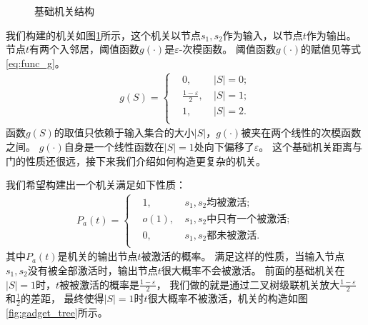 \begin{figure}[htbp]
\centering
{}
\caption{基础机关结构}
\label{fig:gadget_basic}
\end{figure}
我们构建的机关如图\ref{fig:gadget_basic}所示，这个机关以节点$s_1,s_2$作为输入，以节点$t$作为输出。
节点$t$有两个入邻居，阈值函数$g(\cdot)$是$\varepsilon$-次模函数。
阈值函数$g(\cdot)$的赋值见等式\ref{eq:func_g}。
\begin{eqnarray*}
\label{eq:func_g}
g(S) =
\left\lbrace
\begin{aligned}
&0,		~ & |S|=0; \\
&\frac{1-\varepsilon}{2},	~ & |S|=1; \\
&1,		~ & |S|=2. \\
\end{aligned}
\right.
\end{eqnarray*}
函数$g(S)$的取值只依赖于输入集合的大小$|S|$，$g(\cdot)$被夹在两个线性的次模函数之间。
$g(\cdot)$自身是一个线性函数在$|S|=1$处向下偏移了$\varepsilon$。
这个基础机关距离与门的性质还很远，接下来我们介绍如何构造更复杂的机关。


我们希望构建出一个机关满足如下性质：
\begin{eqnarray*}
P_a(t) =
\left\lbrace
\begin{aligned}
&1,		~ & \mbox{$s_1,s_2$均被激活}; \\
&o(1),	~ & \mbox{$s_1,s_2$中只有一个被激活}; \\
&0,		~ & \mbox{$s_1,s_2$都未被激活}. \\
\end{aligned}
\right.
\end{eqnarray*}
其中$P_a(t)$是机关的输出节点$t$被激活的概率。
满足这样的性质，当输入节点$s_1,s_2$没有被全部激活时，输出节点$t$很大概率不会被激活。
前面的基础机关在$|S|=1$时，$t$被被激活的概率是$\frac{1-\varepsilon}{2}$，
我们做的就是通过二叉树级联机关放大$\frac{1-\varepsilon}{2}$和$\frac{1}{2}$的差距，
最终使得$|S|=1$时$t$很大概率不被激活，机关的构造如图\ref{fig:gadget_tree}所示。


